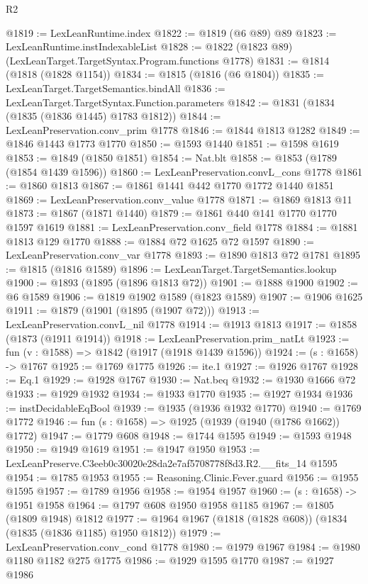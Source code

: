 \begin{lexlean}{R2}
\begin{coremodule}
@1819 := LexLeanRuntime.index
@1822 := @1819 (@6 @89) @89
@1823 := LexLeanRuntime.instIndexableList
@1828 := @1822 (@1823 @89) (LexLeanTarget.TargetSyntax.Program.functions @1778)
@1831 := @1814 (@1818 (@1828 @1154))
@1834 := @1815 (@1816 (@6 @1804))
@1835 := LexLeanTarget.TargetSemantics.bindAll
@1836 := LexLeanTarget.TargetSyntax.Function.parameters
@1842 := @1831 (@1834 (@1835 (@1836 @1445) @1783 @1812))
@1844 := LexLeanPreservation.conv_prim @1778
@1846 := @1844 @1813 @1282
@1849 := @1846 @1443 @1773 @1770
@1850 := @1593 @1440
@1851 := @1598 @1619
@1853 := @1849 (@1850 @1851)
@1854 := Nat.blt
@1858 := @1853 (@1789 (@1854 @1439 @1596))
@1860 := LexLeanPreservation.convL_cons @1778
@1861 := @1860 @1813
@1867 := @1861 @1441 @442 @1770 @1772 @1440 @1851
@1869 := LexLeanPreservation.conv_value @1778
@1871 := @1869 @1813 @11
@1873 := @1867 (@1871 @1440)
@1879 := @1861 @440 @141 @1770 @1770 @1597 @1619
@1881 := LexLeanPreservation.conv_field @1778
@1884 := @1881 @1813 @129 @1770
@1888 := @1884 @72 @1625 @72 @1597
@1890 := LexLeanPreservation.conv_var @1778
@1893 := @1890 @1813 @72 @1781
@1895 := @1815 (@1816 @1589)
@1896 := LexLeanTarget.TargetSemantics.lookup
@1900 := @1893 (@1895 (@1896 @1813 @72))
@1901 := @1888 @1900
@1902 := @6 @1589
@1906 := @1819 @1902 @1589 (@1823 @1589)
@1907 := @1906 @1625
@1911 := @1879 (@1901 (@1895 (@1907 @72)))
@1913 := LexLeanPreservation.convL_nil @1778
@1914 := @1913 @1813
@1917 := @1858 (@1873 (@1911 @1914))
@1918 := LexLeanPreservation.prim_natLt
@1923 := fun (v : @1588) => @1842 (@1917 (@1918 @1439 @1596))
@1924 := (s : @1658) -> @1767
@1925 := @1769 @1775
@1926 := ite.{1}
@1927 := @1926 @1767
@1928 := Eq.{1}
@1929 := @1928 @1767
@1930 := Nat.beq
@1932 := @1930 @1666 @72
@1933 := @1929 @1932
@1934 := @1933 @1770
@1935 := @1927 @1934
@1936 := instDecidableEqBool
@1939 := @1935 (@1936 @1932 @1770)
@1940 := @1769 @1772
@1946 := fun (s : @1658) => @1925 (@1939 (@1940 (@1786 @1662)) @1772)
@1947 := @1779 @608
@1948 := @1744 @1595
@1949 := @1593 @1948
@1950 := @1949 @1619
@1951 := @1947 @1950
@1953 := LexLeanPreserve.C3eeb0c30020e28da2e7af5708778f8d3.R2.__fits_14 @1595
@1954 := @1785 @1953
@1955 := Reasoning.Clinic.Fever.guard
@1956 := @1955 @1595
@1957 := @1789 @1956
@1958 := @1954 @1957
@1960 := (s : @1658) -> @1951 @1958
@1964 := @1797 @608 @1950 @1958 @1185
@1967 := @1805 (@1809 @1948) @1812
@1977 := @1964 @1967 (@1818 (@1828 @608)) (@1834 (@1835 (@1836 @1185) @1950 @1812))
@1979 := LexLeanPreservation.conv_cond @1778
@1980 := @1979 @1967
@1984 := @1980 @1180 @1182 @275 @1775
@1986 := @1929 @1595 @1770
@1987 := @1927 @1986

\end{coremodule}
\end{lexlean}
